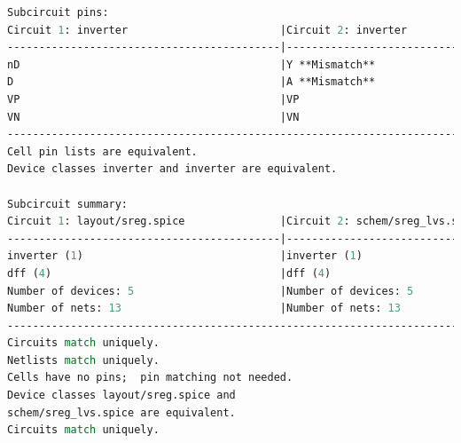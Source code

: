 \documentclass[11pt]{article}
\begin{document}
\begin{lstlisting}[language=tcl, caption=\textbf{Layout versus Schematic for 4-bit Shift Register with Inverter}]
Subcircuit pins:
Circuit 1: inverter                        |Circuit 2: inverter                        
-------------------------------------------|-------------------------------------------
nD                                         |Y **Mismatch**                             
D                                          |A **Mismatch**                             
VP                                         |VP                                         
VN                                         |VN                                         
---------------------------------------------------------------------------------------
Cell pin lists are equivalent.
Device classes inverter and inverter are equivalent.

Subcircuit summary:
Circuit 1: layout/sreg.spice               |Circuit 2: schem/sreg_lvs.spice            
-------------------------------------------|-------------------------------------------
inverter (1)                               |inverter (1)                               
dff (4)                                    |dff (4)                                    
Number of devices: 5                       |Number of devices: 5                       
Number of nets: 13                         |Number of nets: 13                         
---------------------------------------------------------------------------------------
Circuits match uniquely.
Netlists match uniquely.
Cells have no pins;  pin matching not needed.
Device classes layout/sreg.spice and 
schem/sreg_lvs.spice are equivalent.
Circuits match uniquely.

    \end{lstlisting}
\end{document}
